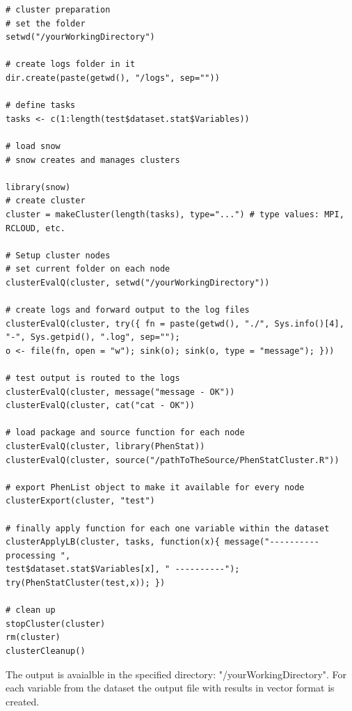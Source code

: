 \documentclass[12pt,a4paper]{article}
\begin{document}
\begingroup
\fontsize{8pt}{12pt}\selectfont
\begin{verbatim}
# cluster preparation
# set the folder
setwd("/yourWorkingDirectory")

# create logs folder in it
dir.create(paste(getwd(), "/logs", sep=""))

# define tasks
tasks <- c(1:length(test$dataset.stat$Variables))

# load snow
# snow creates and manages clusters

library(snow)
# create cluster
cluster = makeCluster(length(tasks), type="...") # type values: MPI, RCLOUD, etc.

# Setup cluster nodes
# set current folder on each node
clusterEvalQ(cluster, setwd("/yourWorkingDirectory"))

# create logs and forward output to the log files
clusterEvalQ(cluster, try({ fn = paste(getwd(), "./", Sys.info()[4], "-", Sys.getpid(), ".log", sep=""); 
o <- file(fn, open = "w"); sink(o); sink(o, type = "message"); }))

# test output is routed to the logs
clusterEvalQ(cluster, message("message - OK"))
clusterEvalQ(cluster, cat("cat - OK"))

# load package and source function for each node
clusterEvalQ(cluster, library(PhenStat))
clusterEvalQ(cluster, source("/pathToTheSource/PhenStatCluster.R"))

# export PhenList object to make it available for every node
clusterExport(cluster, "test") 

# finally apply function for each one variable within the dataset
clusterApplyLB(cluster, tasks, function(x){ message("---------- processing ", 
test$dataset.stat$Variables[x], " ----------"); try(PhenStatCluster(test,x)); })

# clean up
stopCluster(cluster)
rm(cluster)
clusterCleanup()
\end{verbatim}
\endgroup

The output is avaialble in the specified directory: 
"/yourWorkingDirectory". 
For each variable from the dataset the output file with results in vector format is created.
\end{document}
